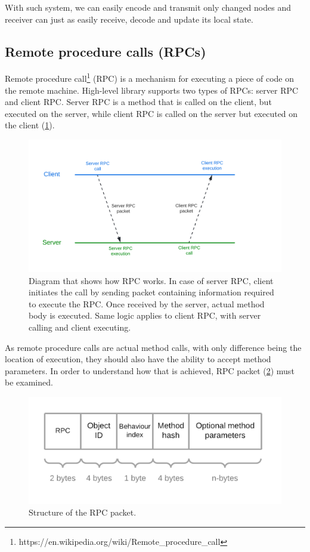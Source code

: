 \documentclass[times, utf8, diplomski]{fer}
\begin{document}
With such system, we can easily encode and transmit only changed nodes and receiver can just as easily receive, decode and update its local state.

\subsection{Remote procedure calls (RPCs)}
Remote procedure call\footnote{https://en.wikipedia.org/wiki/Remote\_procedure\_call} (RPC) is a mechanism for executing a piece of code on the remote machine. High-level library supports two types of RPCs: server RPC and client RPC. Server RPC is a method that is called on the client, but executed on the server, while client RPC is called on the server but executed on the client (\ref{fig:rpc-diagram}).

\begin{figure}[H]
	\centering
	\includegraphics[scale=0.25]{NetworkBehavior-RPC-diagram}
	\caption{Diagram that shows how RPC works. In case of server RPC, client initiates the call by sending packet containing information required to execute the RPC. Once received by the server, actual method body is executed. Same logic applies to client RPC, with server calling and client executing.}
	\label{fig:rpc-diagram}
\end{figure}

As remote procedure calls are actual method calls, with only difference being the location of execution, they should also have the ability to accept method parameters. In order to understand how that is achieved, RPC packet (\ref{fig:rpc-packet-structure}) must be examined.

\begin{figure}[H]
	\centering
	\includegraphics[scale=0.3]{NetworkBehavior-RPC-packet-structure}
	\caption{Structure of the RPC packet.}
	\label{fig:rpc-packet-structure}
\end{figure}
\end{document}
